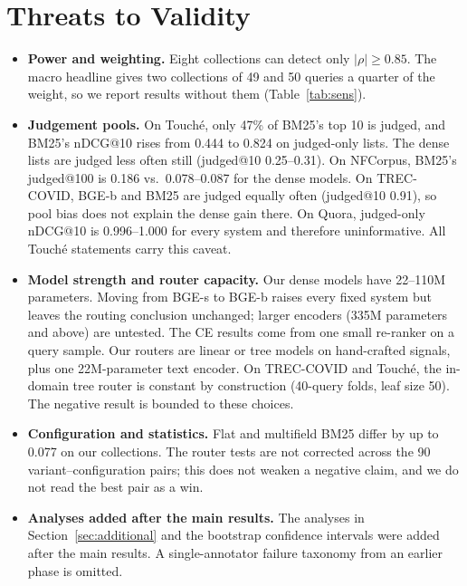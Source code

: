 \documentclass[conference]{IEEEtran}
\makeatletter
\newcommand{\ndcg}{nDCG@10}
\makeatother
\begin{document}
\section{Threats to Validity}
\label{sec:limits}
\begin{itemize}
\item \textbf{Power and weighting.} Eight collections can detect only $|\rho|\geq0.85$. The macro headline gives two collections of 49 and 50 queries a quarter of the weight, so we report results without them (Table~\ref{tab:sens}).
\item \textbf{Judgement pools.} On Touch\'e, only 47\% of BM25's top 10 is judged, and BM25's \ndcg{} rises from 0.444 to 0.824 on judged-only lists. The dense lists are judged less often still (judged@10 0.25--0.31). On NFCorpus, BM25's judged@100 is 0.186 vs.\ 0.078--0.087 for the dense models. On TREC-COVID, BGE-b and BM25 are judged equally often (judged@10 0.91), so pool bias does not explain the dense gain there. On Quora, judged-only \ndcg{} is 0.996--1.000 for every system and therefore uninformative. All Touch\'e statements carry this caveat.
\item \textbf{Model strength and router capacity.} Our dense models have 22--110M parameters. Moving from BGE-s to BGE-b raises every fixed system but leaves the routing conclusion unchanged; larger encoders (335M parameters and above) are untested. The CE results come from one small re-ranker on a query sample. Our routers are linear or tree models on hand-crafted signals, plus one 22M-parameter text encoder. On TREC-COVID and Touch\'e, the in-domain tree router is constant by construction (40-query folds, leaf size 50). The negative result is bounded to these choices.
\item \textbf{Configuration and statistics.} Flat and multifield BM25 differ by up to 0.077 on our collections. The router tests are not corrected across the 90 variant--configuration pairs; this does not weaken a negative claim, and we do not read the best pair as a win.
\item \textbf{Analyses added after the main results.} The analyses in Section~\ref{sec:additional} and the bootstrap confidence intervals were added after the main results. A single-annotator failure taxonomy from an earlier phase is omitted.
\end{itemize}
\end{document}
